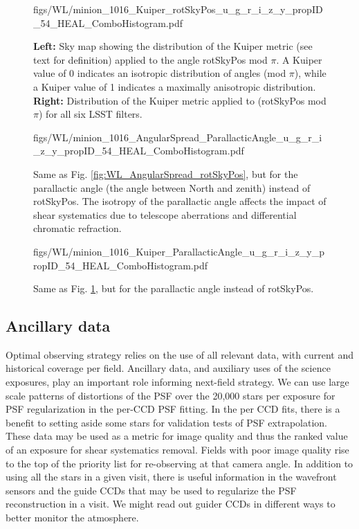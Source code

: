 \begin{figure}[tbh!]
        {figs/WL/minion_1016_Kuiper_rotSkyPos_u_g_r_i_z_y_propID_54_HEAL_ComboHistogram.pdf}
\caption{\textbf{Left:} Sky map showing the distribution of the Kuiper metric
    (see text for definition) applied to the angle rotSkyPos mod $\pi$.  A
    Kuiper value of 0 indicates an isotropic distribution of angles (mod $\pi$),
    while a Kuiper value of 1 indicates a maximally anisotropic distribution.
    \textbf{Right:} Distribution of the Kuiper metric applied to (rotSkyPos mod
    $\pi$) for all six LSST filters.}
\label{fig:WL_Kuiper_rotSkyPos}
\end{figure}


\begin{figure}[tbh!]
        {figs/WL/minion_1016_AngularSpread_ParallacticAngle_u_g_r_i_z_y_propID_54_HEAL_ComboHistogram.pdf}
\caption{Same as Fig. \ref{fig:WL_AngularSpread_rotSkyPos}, but for the
    parallactic angle (the angle between North and zenith) instead of rotSkyPos.
    The isotropy of the parallactic angle affects the impact of shear
    systematics due to telescope aberrations and differential chromatic
    refraction.}
\label{fig:WL_AngularSpread_ParallacticAngle}
\end{figure}

\begin{figure}[tbh!]
        {figs/WL/minion_1016_Kuiper_ParallacticAngle_u_g_r_i_z_y_propID_54_HEAL_ComboHistogram.pdf}
\caption{Same as Fig. \ref{fig:WL_Kuiper_rotSkyPos}, but for the parallactic
    angle instead of rotSkyPos.}
\label{fig:WL_Kuiper_ParallacticAngle}
\end{figure}


\subsection{Ancillary data}

Optimal observing strategy relies on the use of all relevant data, with current
and historical coverage per field.  Ancillary data, and auxiliary uses of the
science exposures, play an important role informing next-field strategy.  We can
use large scale patterns of distortions of the PSF over the 20,000 stars per
exposure for PSF regularization in the per-CCD PSF fitting.  In the per CCD
fits, there is a benefit to setting aside some stars for validation tests of PSF
extrapolation.  These data may be used as a metric for image quality and thus
the ranked value of an exposure for shear systematics removal.  Fields with poor
image quality rise to the top of the priority list for re-observing at that
camera angle.  In addition to using all the stars in a given visit, there is
useful information in the wavefront sensors and the guide CCDs that may be used
to regularize the PSF reconstruction in a visit.  We might read out guider CCDs
in different ways to better monitor the atmosphere.


